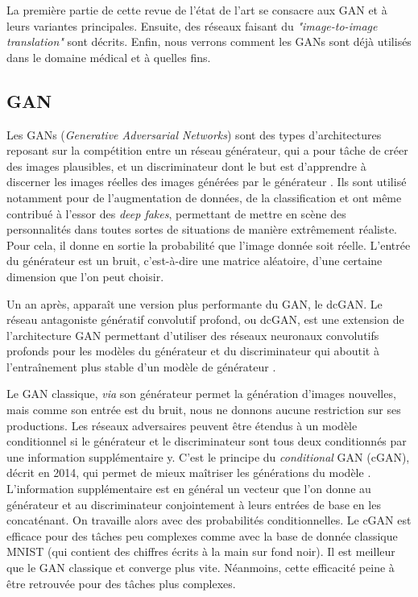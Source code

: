 \documentclass[12pt, oneside, a4paper, titlepage]{article}
\begin{document}
\vspace{5mm} 

La première partie de cette revue de l'état de l'art se consacre aux GAN et à leurs variantes principales. Ensuite, des réseaux faisant du \textit{"image-to-image translation"} sont décrits. Enfin, nous verrons comment les GANs sont déjà utilisés dans le domaine médical et à quelles fins.

\vspace{5mm} 


\subsection{GAN}
 
 \vspace{5mm} 
 Les GANs (\textit{Generative Adversarial Networks}) sont des types d’architectures reposant sur la compétition entre un réseau générateur, qui a pour tâche de créer des images plausibles, et un discriminateur dont le but est d’apprendre à discerner les images réelles des images générées par le générateur \cite{goodfellow_generative_2014}. Ils sont utilisé notamment pour de l'augmentation de données, de la classification et ont même contribué à l'essor des \textit{deep fakes}, permettant de mettre en scène des personnalités dans toutes sortes de situations de manière extrêmement réaliste. Pour cela, il donne en sortie la probabilité que l'image donnée soit réelle. L'entrée du générateur est un bruit, c'est-à-dire une matrice aléatoire, d'une certaine dimension que l'on peut choisir. 
 
Un an après, apparaît une version plus performante du GAN, le dcGAN. Le réseau antagoniste génératif convolutif profond, ou dcGAN, est une extension de l'architecture GAN permettant d'utiliser des réseaux neuronaux convolutifs profonds pour les modèles du générateur et du discriminateur qui aboutit à l'entraînement plus stable d'un modèle de générateur \cite{radford_unsupervised_2016}.
 
 Le GAN classique, \textit{via} son générateur permet la génération d'images nouvelles, mais comme son entrée est du bruit, nous ne donnons aucune restriction sur ses productions. Les réseaux adversaires peuvent être étendus à un modèle conditionnel si le générateur et le discriminateur sont tous deux conditionnés par une information supplémentaire y. C'est le principe du \textit{conditional} GAN (cGAN), décrit en 2014, qui permet de mieux maîtriser les générations du modèle \cite{mirza_conditional_2014}. L'information supplémentaire est en général un vecteur que l'on donne au générateur et au discriminateur conjointement à leurs entrées de base en les concaténant. On travaille alors avec des probabilités conditionnelles.
Le cGAN est efficace pour des tâches peu complexes comme avec la base de donnée classique MNIST (qui contient des chiffres écrits à la main sur fond noir). Il est meilleur que le GAN classique et converge plus vite. Néanmoins, cette efficacité peine à être retrouvée pour des tâches plus complexes. 
\end{document}
